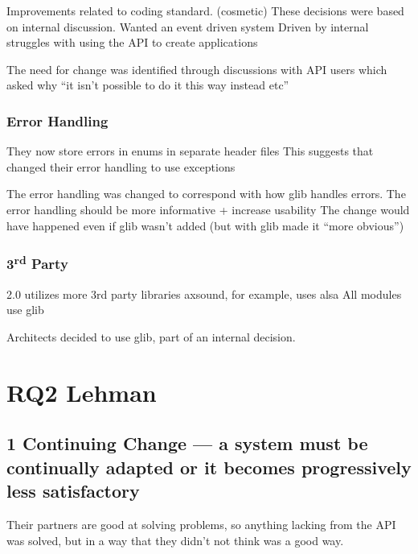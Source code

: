 \documentclass[conference]{IEEEtran}
\begin{document}
Improvements related to coding standard. (cosmetic)
These decisions were based on internal discussion.
Wanted an event driven system
Driven by internal struggles with using the API to create applications

The need for change was identified through discussions with API users which asked why “it isn’t possible to do it this way instead etc”





\subsubsection{Error Handling}

They now store errors in enums in separate header files
This suggests that changed their error handling to use exceptions




The error handling was changed to correspond with how glib handles errors. 
The error handling should be more informative + increase usability
The change would have happened even if glib wasn’t added (but with glib made it “more obvious”)





\subsubsection{3\textsuperscript{rd} Party}

2.0 utilizes more 3rd party libraries
axsound, for example, uses alsa
All modules use glib





Architects decided to use glib, part of an internal decision. 



\section{RQ2 Lehman}


\subsection{1 Continuing Change — a system must be continually adapted or it becomes progressively less satisfactory}

Their partners are good at solving problems, so anything lacking from the API was solved, but in a way that they didn’t not think was a good way. 
\end{document}
